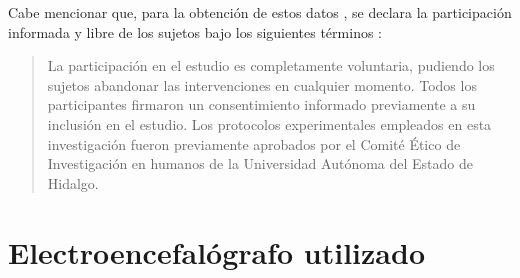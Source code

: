 Cabe mencionar que,
para la obtenci\'on de estos datos ,
se declara la participaci\'on informada 
y libre de los sujetos bajo los siguientes t\'erminos \cite{VazquezTagle16}:
\begin{quote}
La participaci\'on en el estudio es completamente 
voluntaria, pudiendo los sujetos abandonar las intervenciones en cualquier momento. Todos los 
participantes firmaron un consentimiento informado previamente a su inclusi\'on en el estudio. 
Los protocolos experimentales empleados en esta investigaci\'on fueron previamente aprobados por 
el Comit\'e \'Etico de Investigaci\'on en humanos de la Universidad Autónoma del Estado de Hidalgo.
\end{quote}


\section{Electroencefal\'ografo utilizado}


